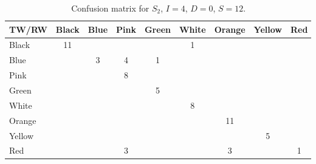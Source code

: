 \begin{table}[h!]
\begin{center}
  \begin{tabular}{|l|*{8}{c|}}
  \hline
 TW/RW  & Black & Blue & Pink & Green & White & Orange & Yellow & Red \\
\hline
Black & 11 & & & & 1 & & &  \\	
\hline
Blue  &	& 3 & 4 & 1 & & & & \\
\hline
Pink  & & & 8 & & & & & \\
\hline				
Green & & & & 5 & & & & \\
\hline
White & & & & & 8 & & & \\
\hline
Orange & & & & & & 11 &  & 	\\
\hline
Yellow & & & & & & & 5 & \\
\hline
Red & & & 3 & & & 3 & & 1 \\
\hline
  \end{tabular}
\end{center}
\caption{Confusion matrix for $S_2$, $I = 4$, $D = 0$, $S=12$.}
\label{tad:clem_result}
\end{table}

